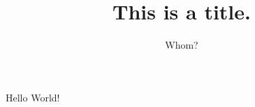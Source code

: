 \documentclass{ximera}
\begin{document}
\title{This is a title.}
\author{Whom?}
Hello World!
\end{document}
